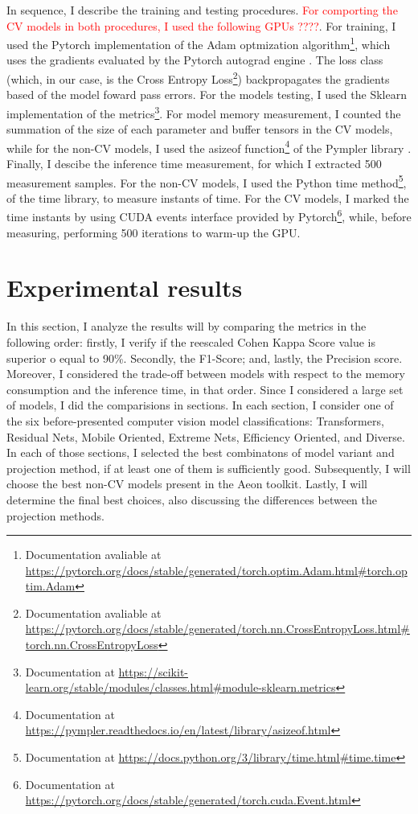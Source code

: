 In sequence, I describe the training and testing procedures. \textcolor{red}{For comporting the \gls{CV} models in both procedures, I used the following GPUs ????}. For training, I used the Pytorch implementation of the Adam optmization algorithm\footnote{Documentation avaliable at \url{https://pytorch.org/docs/stable/generated/torch.optim.Adam.html\#torch.optim.Adam}}, which uses the gradients evaluated by the Pytorch autograd engine \cite{Pytorch}. The loss class (which, in our case, is the Cross Entropy Loss\footnote{Documentation avaliable at \url{https://pytorch.org/docs/stable/generated/torch.nn.CrossEntropyLoss.html\#torch.nn.CrossEntropyLoss}}) backpropagates the gradients based of the model foward pass errors. For the models testing, I used the Sklearn \cite{Sklearn} implementation of the metrics\footnote{Documentation at \url{https://scikit-learn.org/stable/modules/classes.html\#module-sklearn.metrics}}. For model memory measurement, I counted the summation of the size of each parameter and buffer tensors in the \gls{CV} models, while for the non-\gls{CV} models, I used the asizeof function\footnote{Documentation at \url{https://pympler.readthedocs.io/en/latest/library/asizeof.html}} of the Pympler library \cite{Pympler}. Finally, I descibe the inference time measurement, for which I extracted 500 measurement samples.  For the non-\gls{CV} models, I used the Python time method\footnote{Documentation at \url{https://docs.python.org/3/library/time.html\#time.time}}, of the time library, to measure instants of time. For the \gls{CV} models, I marked the time instants by using CUDA events interface provided by Pytorch\footnote{Documentation at \url{https://pytorch.org/docs/stable/generated/torch.cuda.Event.html}}, while, before measuring, performing 500 iterations to warm-up the GPU. 

\section{Experimental results}


In this section, I analyze the results will by comparing the metrics in the following order: firstly, I verify if the reescaled Cohen Kappa Score value is superior o equal to 90\%. Secondly, the F1-Score; and, lastly, the Precision score. Moreover, I considered the trade-off between models with respect to the memory consumption and the inference time, in that order. Since I considered a large set of models, I did the comparisions in sections. In each section, I consider one of the six before-presented computer vision model classifications: Transformers, Residual Nets, Mobile Oriented, Extreme Nets, Efficiency Oriented, and Diverse. In each of those sections, I selected the best combinatons of model variant and projection method, if at least one of them is sufficiently good. Subsequently, I will choose the best non-\gls{CV} models present in the Aeon toolkit. Lastly, I will determine the final best choices, also discussing the differences between the projection methods.

